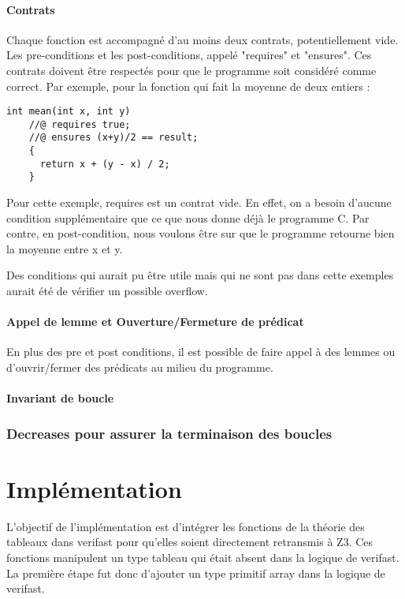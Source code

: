\documentclass[9pt]{book}
\begin{document}
		\subsubsection{Contrats}
			Chaque fonction est accompagn\'e d'au moins deux contrats, potentiellement vide. Les pre-conditions et les post-conditions, appel\'e "requires" et "ensures". Ces contrats doivent \^etre respect\'es pour que le programme soit consid\'er\'e comme correct. Par exemple, pour la fonction qui fait la moyenne de deux entiers :
			\begin{lstlisting}
int mean(int x, int y)
	//@ requires true;
	//@ ensures (x+y)/2 == result;
	{
	  return x + (y - x) / 2;
	}
			\end{lstlisting}
	Pour cette exemple, requires est un contrat vide. En effet, on a besoin d'aucune condition suppl\'ementaire que ce que nous donne d\'ej\`a le programme C. Par contre, en post-condition, nous voulons \^etre sur que le programme retourne bien la moyenne entre x et y.\par
	Des conditions qui aurait pu \^etre utile mais qui ne sont pas dans cette exemples aurait \'et\'e de v\'erifier un possible overflow.
		\subsubsection{Appel de lemme et Ouverture/Fermeture de pr\'edicat}
			En plus des pre et post conditions, il est possible de faire appel \`a des lemmes ou d'ouvrir/fermer des pr\'edicats au milieu du programme.
		\subsubsection{Invariant de boucle}
			
		\subsection{Decreases pour assurer la terminaison des boucles}
		
\chapter{Impl\'ementation}
	L'objectif de l'impl\'ementation est d'int\'egrer les fonctions de la th\'eorie des tableaux dans verifast pour qu'elles soient directement retransmis \`a Z3. Ces fonctions manipulent un type tableau qui \'etait absent dans la logique de verifast. La premi\`ere \'etape fut donc d'ajouter un type primitif array dans la logique de verifast. 
\end{document}

